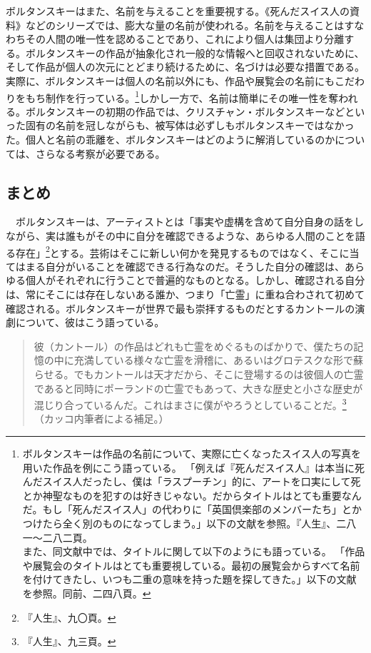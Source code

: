 \documentclass[b5j,twoside,twocolumn]{utarticle}
\newcommand{\mysubsection}[1]{\vspace{-6mm}\subsection{#1}\vspace{-2mm}}
\begin{document}
ボルタンスキーはまた、名前を与えることを重要視する。《死んだスイス人の資料》などのシリーズでは、膨大な量の名前が使われる。名前を与えることはすなわちその人間の唯一性を認めることであり、これにより個人は集団より分離する。ボルタンスキーの作品が抽象化され一般的な情報へと回収されないために、そして作品が個人の次元にとどまり続けるために、名づけは必要な措置である。実際に、ボルタンスキーは個人の名前以外にも、作品や展覧会の名前にもこだわりをもち制作を行っている。\footnote{ボルタンスキーは作品の名前について、実際に亡くなったスイス人の写真を用いた作品を例にこう語っている。
「例えば『死んだスイス人』は本当に死んだスイス人だったし、僕は「ラスプーチン」的に、アートを口実にして死とか神聖なものを犯すのは好きじゃない。だからタイトルはとても重要なんだ。もし「死んだスイス人」の代わりに「英国倶楽部のメンバーたち」とかつけたら全く別のものになってしまう。」以下の文献を参照。『人生』、二八一～二八二頁。\\また、同文献中では、タイトルに関して以下のようにも語っている。
「作品や展覧会のタイトルはとても重要視している。最初の展覧会からすべて名前を付けてきたし、いつも二重の意味を持った題を探してきた。」以下の文献を参照。同前、二四八頁。}しかし一方で、名前は簡単にその唯一性を奪われる。ボルタンスキーの初期の作品では、クリスチャン・ボルタンスキーなどといった固有の名前を冠しながらも、被写体は必ずしもボルタンスキーではなかった。個人と名前の乖離を、ボルタンスキーはどのように解消しているのかについては、さらなる考察が必要である。

\mysubsection{まとめ}
　ボルタンスキーは、アーティストとは「事実や虚構を含めて自分自身の話をしながら、実は誰もがその中に自分を確認できるような、あらゆる人間のことを語る存在」\footnote{『人生』、九〇頁。}とする。芸術はそこに新しい何かを発見するものではなく、そこに当てはまる自分がいることを確認できる行為なのだ。そうした自分の確認は、あらゆる個人がそれぞれに行うことで普遍的なものとなる。しかし、確認される自分は、常にそこには存在しないある誰か、つまり「亡霊」に重ね合わされて初めて確認される。ボルタンスキーが世界で最も崇拝するものだとするカントールの演劇について、彼はこう語っている。
\begin{quote}
彼（カントール）の作品はどれも亡霊をめぐるものばかりで、僕たちの記憶の中に充満している様々な亡霊を滑稽に、あるいはグロテスクな形で蘇らせる。でもカントールは天才だから、そこに登場するのは彼個人の亡霊であると同時にポーランドの亡霊でもあって、大きな歴史と小さな歴史が混じり合っているんだ。これはまさに僕がやろうとしていることだ。\footnote{『人生』、九三頁。}（カッコ内筆者による補足。） 
\end{quote}
\end{document}
